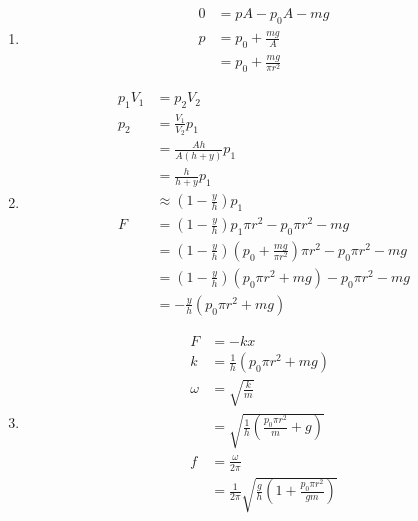 \documentclass{article}
\begin{document}
\begin{enumerate}
  \item

        \begin{align*}
          0 & = p A - p_0 A - m g         \\
          p & = p_0 + \frac{m g}{A}       \\
            & = p_0 + \frac{m g}{\pi r^2}
        \end{align*}

  \item

        \begin{align*}
          p_1 V_1 & = p_2 V_2                                                                                             \\
          p_2     & = \frac{V_1}{V_2} p_1                                                                                 \\
                  & = \frac{A h}{A (h + y)} p_1                                                                           \\
                  & = \frac{h}{h + y} p_1                                                                                 \\
                  & \approx \left( 1 - \frac{y}{h} \right) p_1                                                            \\
          F       & = \left( 1 - \frac{y}{h} \right) p_1 \pi r^2 - p_0 \pi r^2 - m g                                      \\
                  & = \left( 1 - \frac{y}{h} \right) \left( p_0 + \frac{m g}{\pi r^2} \right) \pi r^2 - p_0 \pi r^2 - m g \\
                  & = \left( 1 - \frac{y}{h} \right) \left( p_0 \pi r^2 + m g \right) - p_0 \pi r^2 - m g                 \\
                  & = -\frac{y}{h} (p_0 \pi r^2 + m g)
        \end{align*}

  \item

        \begin{align*}
          F      & = -k x                                                                          \\
          k      & = \frac{1}{h} (p_0 \pi r^2 + m g)                                               \\
          \omega & = \sqrt{\frac{k}{m}}                                                            \\
                 & = \sqrt{\frac{1}{h} \left( \frac{p_0 \pi r^2}{m} + g \right)}                   \\
          f      & = \frac{\omega}{2 \pi}                                                          \\
                 & = \frac{1}{2 \pi} \sqrt{\frac{g}{h} \left( 1 + \frac{p_0 \pi r^2}{g m} \right)}
        \end{align*}


\end{enumerate}
\end{document}
